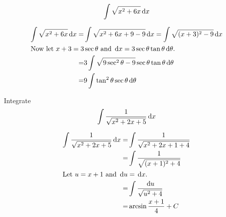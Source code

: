 \begin{ex}
  \[ \int \sqrt{x^2+6x} \,\mathrm{d} x \]
  \begin{sol}
    \begin{align*}
      \int \sqrt{x^2+6x} \,\mathrm{d} x =&\int \sqrt{x^2+6x+9-9}\,\mathrm{d} x
      =\int \sqrt{(x+3)^2-9}\,\mathrm{d} x \\
      \intertext{Now let $x+3=3\sec\theta$ and $\,\mathrm{d} x=3\sec\theta \tan\theta \,\mathrm{d}\theta$.}
      =& 3 \int \sqrt{9\sec^2\theta-9}\sec\theta \tan\theta \,\mathrm{d} \theta \\
      =& 9 \int \tan^2\theta\sec\theta\,\mathrm{d}\theta
  \end{align*}
\end{sol}
\end{ex}
\begin{ex}
  Integrate
    \[ \int \frac{1}{\sqrt{x^2+2x+5}}\,\mathrm{d} x \]
  \begin{sol}
    \begin{align*}
      \int \frac{1}{\sqrt{x^2+2x+5}}\,\mathrm{d} x
      =& \int \frac{1}{\sqrt{x^2+2x+1+4}} \\
      =& \int \frac{1}{\sqrt{(x+1)^2+4}} \\
      \intertext{Let $u=x+1$ and $\,\mathrm{d} u=\,\mathrm{d} x$.}
      =& \int \frac{\,\mathrm{d} u}{\sqrt{u^2+4}} \\
      =& \arcsin \frac{x+1}{4}+C
    \end{align*}
  \end{sol}
\end{ex}


